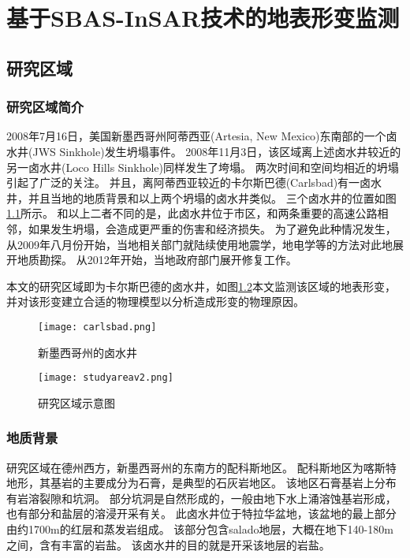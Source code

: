 \chapter{基于SBAS-InSAR技术的地表形变监测}

\section{研究区域}

\subsection{研究区域简介}
2008年7月16日，美国新墨西哥州阿蒂西亚(Artesia, New Mexico)东南部的一个卤水井(JWS Sinkhole)发生坍塌事件。
2008年11月3日，该区域离上述卤水井较近的另一卤水井(Loco Hills Sinkhole)同样发生了垮塌。
两次时间和空间均相近的坍塌引起了广泛的关注。
并且，离阿蒂西亚较近的卡尔斯巴德(Carlsbad)有一卤水井，并且当地的地质背景和以上两个坍塌的卤水井类似。
三个卤水井的位置如图\ref{fig:carlsbad}所示。
和以上二者不同的是，此卤水井位于市区，和两条重要的高速公路相邻，如果发生坍塌，会造成更严重的伤害和经济损失。
为了避免此种情况发生，从2009年八月份开始，当地相关部门就陆续使用地震学，地电学等的方法对此地展开地质勘探。
从2012年开始，当地政府部门展开修复工作。

本文的研究区域即为卡尔斯巴德的卤水井，如图\ref{fig:studyarea}本文监测该区域的地表形变，
并对该形变建立合适的物理模型以分析造成形变的物理原因。
\begin{figure}[htb]
  \centering
  \texttt{[image: carlsbad.png]}
  \caption{新墨西哥州的卤水井}
  \label{fig:carlsbad}
\end{figure}
\begin{figure}[htb]
    \centering
    \texttt{[image: studyareav2.png]}
    \caption{研究区域示意图}
    \label{fig:studyarea}
\end{figure}
\subsection{地质背景}
研究区域在德州西方，新墨西哥州的东南方的配科斯地区。
配科斯地区为喀斯特地形，其基岩的主要成分为石膏，是典型的石灰岩地区。
该地区石膏基岩上分布有岩溶裂隙和坑洞。
部分坑洞是自然形成的，一般由地下水上涌溶蚀基岩形成，也有部分和盐层的溶浸开采有关。
此卤水井位于特拉华盆地，该盆地的最上部分由约1700m的红层和蒸发岩组成。
该部分包含salado地层，大概在地下140-180m之间，含有丰富的岩盐。
该卤水井的目的就是开采该地层的岩盐。

